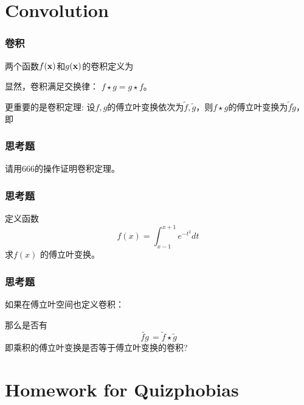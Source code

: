 \documentclass[CJK,13pt]{beamer}
\begin{document}
\section{Convolution}


\begin{frame}
  \frametitle{卷积}
  
  
  两个函数$f({\mathbf{x}})$和$g({\mathbf{x}})$的卷积定义为

  显然，卷积满足交换律： {\blue $f\star g = g\star f$}。

  更重要的是卷积定理: 设$f,g$的傅立叶变换依次为$\widetilde{f},\widetilde{g}$，则$f\star g$的傅立叶变换为$\widetilde{f}\widetilde{g}$，即
  
 \end{frame}


\begin{frame}
  \frametitle{思考题}
  
  请用666的操作证明卷积定理。
  
\end{frame}


\begin{frame}
  \frametitle{思考题}

  定义函数
  $$ f(x) = \int_{x-1}^{x+1}e^{-t^2}dt $$
  求$f(x)$ 的傅立叶变换。
  
 \end{frame}



\begin{frame}
  \frametitle{思考题}

  如果在傅立叶空间也定义卷积：

  那么是否有
  $$\widetilde{\,fg\,} = \widetilde{f}\star \widetilde{g} $$
  即乘积的傅立叶变换是否等于傅立叶变换的卷积?
  
 \end{frame}





\section{Homework for Quizphobias}
\end{document}
